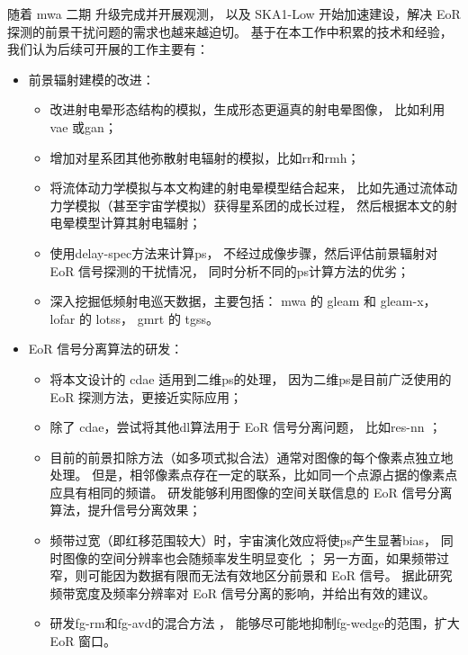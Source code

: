 \begin{summary}
随着 \ac{mwa} 二期 \cite{wayth2018} 升级完成并开展观测，
以及 SKA1-Low 开始加速建设，解决 EoR 探测的前景干扰问题的需求也越来越迫切。
基于在本工作中积累的技术和经验，我们认为后续可开展的工作主要有：
\begin{itemize}
\item 前景辐射建模的改进：
  \begin{itemize}
    \item 改进射电晕形态结构的模拟，生成形态更逼真的射电晕图像，
      比如利用\ac{vae}\cite{kingma2013} 或\ac{gan}\cite{goodfellow2014}；
    \item 增加对星系团其他弥散射电辐射的模拟，比如\ac{rr}和\ac{rmh}；
    \item 将流体动力学模拟与本文构建的射电晕模型结合起来，
      比如先通过流体动力学模拟（甚至宇宙学模拟）获得星系团的成长过程，
      然后根据本文的射电晕模型计算其射电辐射；
    \item 使用\ac{delay-spec}方法\cite{parsons2012}来计算\ac{ps}，
      不经过成像步骤，然后评估前景辐射对 EoR 信号探测的干扰情况，
      同时分析不同的\ac{ps}计算方法的优劣；
    \item 深入挖掘低频射电巡天数据，主要包括：
      \ac{mwa} 的 \ac{gleam}\cite{wayth2015,hurleyWalker2017}
      和 \ac{gleam-x}\cite{hurleyWalker2017prop}，
      \ac{lofar} 的 \ac{lotss}\cite{shimwell2017,shimwell2019}，
      \ac{gmrt} 的 \ac{tgss}\cite{intema2017}。
  \end{itemize}

\item EoR 信号分离算法的研发：
  \begin{itemize}
    \item 将本文设计的 \ac{cdae} 适用到二维\ac{ps}的处理，
      因为二维\ac{ps}是目前广泛使用的 EoR 探测方法，更接近实际应用；
    \item 除了 \ac{cdae}，尝试将其他\ac{dl}算法用于 EoR 信号分离问题，
      比如\ac{res-nn} \cite{he2016}；
    \item 目前的前景扣除方法（如多项式拟合法）通常对图像的每个像素点独立地处理。
      但是，相邻像素点存在一定的联系，比如同一个点源占据的像素点应具有相同的频谱。
      研发能够利用图像的空间关联信息的 EoR 信号分离算法，提升信号分离效果；
    \item 频带过宽（即红移范围较大）时，宇宙演化效应将使\ac{ps}产生显著\ac{bias}，
      同时图像的空间分辨率也会随频率发生明显变化 \cite{bowman2009}；
      另一方面，如果频带过窄，则可能因为数据有限而无法有效地区分前景和 EoR 信号。
      据此研究频带宽度及频率分辨率对 EoR 信号分离的影响，并给出有效的建议。
    \item 研发\ac{fg-rm}和\ac{fg-avd}的混合方法 \cite{kerrigan2018}，
      能够尽可能地抑制\ac{fg-wedge}的范围，扩大 EoR 窗口。
  \end{itemize}
\end{itemize}

\end{summary}
